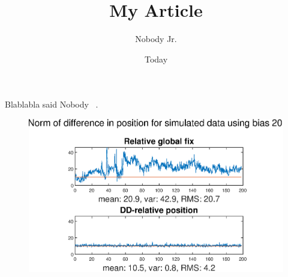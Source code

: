 \documentclass[11pt]{article}
\begin{document}
\title{My Article}
\author{Nobody Jr.}
\date{Today}
\maketitle

Blablabla said Nobody ~\cite{Nobody06}.
\begin{figure}
\includegraphics[scale=0.8]{Results/Esim.eps} 
\end{figure}
%
\end{document}
